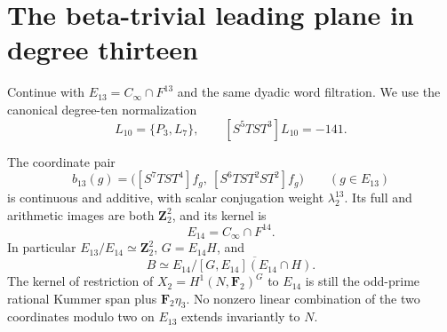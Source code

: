 \section{The beta-trivial leading plane in degree thirteen}
\label{sec:thirteen-normalization}

Continue with $E_{13}=C_\infty\cap F^{13}$ and the same dyadic
word filtration. We use the canonical degree-ten normalization
\[
 L_{10}=\{P_3,L_7\},\qquad [S^5TST^3]L_{10}=-141.
\]

\begin{theorem}\label{thm:thirteen-normalization}
The coordinate pair
\[
 b_{13}(g)=
 \bigl([S^7TST^4]f_g,\ [S^6TST^2ST^2]f_g\bigr)
 \qquad(g\in E_{13})
\]
is continuous and additive, with scalar conjugation weight
$\lambda_2^{13}$. Its full and arithmetic images are both
$\mathbf Z_2^2$, and its kernel is
\[
 E_{14}=C_\infty\cap F^{14}.
\]
In particular $E_{13}/E_{14}\simeq\mathbf Z_2^2$,
$G=E_{14}H$, and
\[
 B\simeq E_{14}/\overline{[G,E_{14}](E_{14}\cap H)}.
\]
The kernel of restriction of $X_2=H^1(N,\mathbf F_2)^G$ to
$E_{14}$ is still the odd-prime rational Kummer span plus
$\mathbf F_2\eta_3$. No nonzero linear combination of the two
coordinates modulo two on $E_{13}$ extends invariantly to $N$.
\end{theorem}

